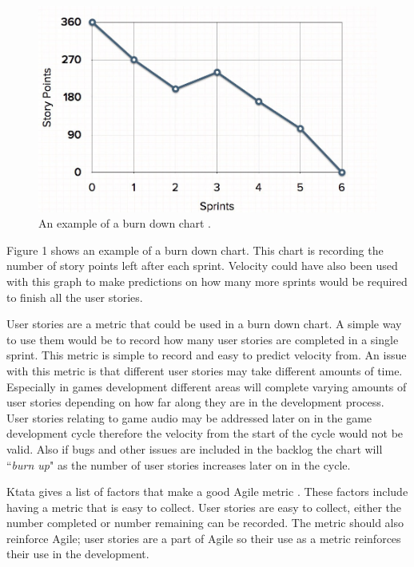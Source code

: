 \documentclass{scrartcl}
\begin{document}
\begin{figure}[h]
	\includegraphics[width=1.0\linewidth]{BDChart.jpg}
	\caption{ An example of a burn down chart \cite{MGS}.}
\end{figure}

Figure 1 shows an example of a burn down chart. This chart is recording the number of story points left after each sprint. Velocity could have also been used with this graph to make predictions on how many more sprints would be required to finish all the user stories.

User stories are a metric that could be used in a burn down chart. A simple way to use them would be to record how many user stories are completed in a single sprint. This metric is simple to record and easy to predict velocity from. An issue with this metric is that different user stories may take different amounts of time. Especially in games development different areas will complete varying amounts of user stories depending on how far along they are in the development process. User stories relating to game audio may be addressed later on in the game development cycle therefore the velocity from the start of the cycle would not be valid. Also if bugs and other issues are included in the backlog the chart will ``\textit{burn up}" as the number of user stories increases later on in the cycle.

Ktata gives a list of factors that make a good Agile metric \cite{Ktata}. These factors include having a metric that is easy to collect. User stories are easy to collect, either the number completed or number remaining can be recorded. The metric should also reinforce Agile; user stories are a part of Agile so their use as a metric reinforces their use in the development.
\end{document}
